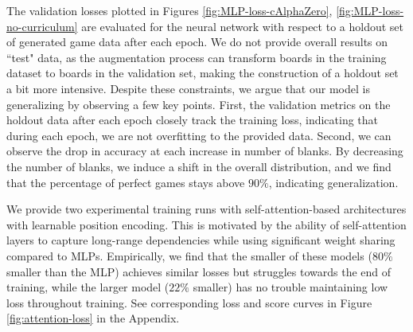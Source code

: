 \documentclass[10pt, reqno, letterpaper, twoside]{amsart}
\begin{document}
The validation losses plotted in Figures \ref{fig:MLP-loss-cAlphaZero}, \ref{fig:MLP-loss-no-curriculum} are evaluated for the neural network with respect to a holdout set of generated game data after each epoch. We do not provide overall results on ``test" data, as the augmentation process can transform boards in the training dataset to boards in the validation set, making the construction of a holdout set a bit more intensive. Despite these constraints, we argue that our model is generalizing by observing a few key points. First, the validation metrics on the holdout data after each epoch closely track the training loss, indicating that during each epoch, we are not overfitting to the provided data. Second, we can observe the drop in accuracy at each increase in number of blanks. By decreasing the number of blanks, we induce a shift in the overall distribution, and we find that the percentage of perfect games stays above $90\%$, indicating generalization.

We provide two experimental training runs with self-attention-based architectures with learnable position encoding. This is motivated by the ability of self-attention layers to capture long-range dependencies while using significant weight sharing compared to MLPs. Empirically, we find that the smaller of these models ($80\%$ smaller than the MLP) achieves similar losses but struggles towards the end of training, while the larger model ($22\%$ smaller) has no trouble maintaining low loss throughout training. See corresponding loss and score curves in Figure \ref{fig:attention-loss} in the Appendix.
\end{document}
